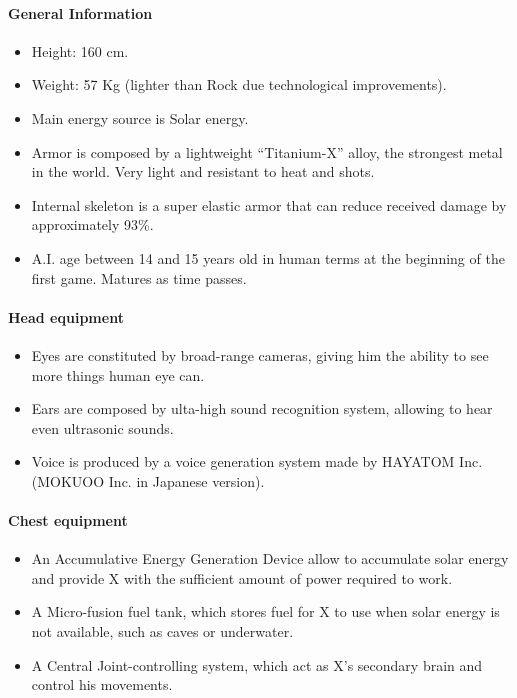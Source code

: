 \paragraph{General Information}
\begin{itemize}
	\item Height: 160 cm.
	\item Weight: 57 Kg (lighter than Rock due technological improvements).
	\item Main energy source is Solar energy.
	\item Armor is composed by a lightweight ``Titanium-X'' alloy, the strongest metal in the world. Very light and resistant to heat and shots.
	\item Internal skeleton is a super elastic armor that can reduce received damage by approximately 93\%.
	\item A.I. age between 14 and 15 years old in human terms at the beginning of the first game. Matures as time passes.
\end{itemize}

\paragraph{Head equipment}
\begin{itemize}
	\item Eyes are constituted by broad-range cameras, giving him the ability to see more things human eye can.
	\item Ears are composed by ulta-high sound recognition system, allowing to hear even ultrasonic sounds.
	\item Voice is produced by a voice generation system made by HAYATOM Inc. (MOKUOO Inc. in Japanese version). 
\end{itemize}

\paragraph{Chest equipment}
\begin{itemize}
	\item An Accumulative Energy Generation Device allow to accumulate solar energy and provide X with the sufficient amount of power required to work.
	\item A Micro-fusion fuel tank, which stores fuel for X to use when solar energy is not available, such as caves or underwater.
	\item A Central Joint-controlling system, which act as X's secondary brain and control his movements.
\end{itemize}


